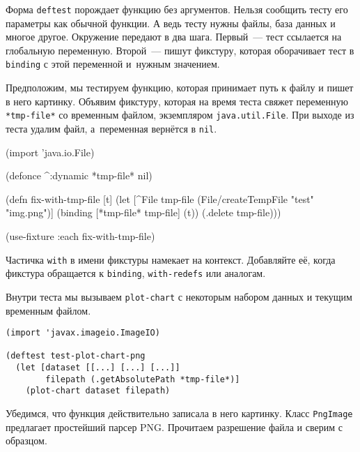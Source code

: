 Форма \verb|deftest| порождает функцию без аргументов. Нельзя сообщить тесту его
параметры как обычной функции. А ведь тесту нужны файлы, база данных и многое
другое. Окружение передают в два шага. Первый~--- тест ссылается на глобальную
переменную. Второй~--- пишут фикстуру, которая оборачивает тест в \verb|binding|
с этой переменной и~нужным значением.

Предположим, мы тестируем функцию, которая принимает путь к файлу и пишет в него
картинку. Объявим фикстуру, которая на время теста свяжет переменную
\verb|*tmp-file*| со временным файлом, экземпляром \verb|java.util.File|. При
выходе из теста удалим файл, а~переменная вернётся в \verb|nil|.


\begin{english}
  \begin{clojure}
(import 'java.io.File)

(defonce ^:dynamic *tmp-file* nil)

(defn fix-with-tmp-file [t]
  (let [^File tmp-file (File/createTempFile "test" "img.png")]
    (binding [*tmp-file* tmp-file]
      (t))
    (.delete tmp-file)))

(use-fixture :each fix-with-tmp-file)
  \end{clojure}
\end{english}

Частичка \verb|with| в имени фикстуры намекает на контекст. Добавляйте её,
когда фикстура обращается к \verb|binding|, \verb|with-redefs| или аналогам.


Внутри теста мы вызываем \verb|plot-chart| с некоторым набором данных и текущим
временным файлом.

\begin{english}
  \begin{verbatim}
(import 'javax.imageio.ImageIO)

(deftest test-plot-chart-png
  (let [dataset [[...] [...] [...]]
        filepath (.getAbsolutePath *tmp-file*)]
    (plot-chart dataset filepath)
  \end{verbatim}
\end{english}

\noindent
Убедимся, что функция действительно записала в него картинку. Класс
\verb|PngImage| предлагает простейший парсер PNG. Прочитаем разрешение файла и
сверим с образцом.

